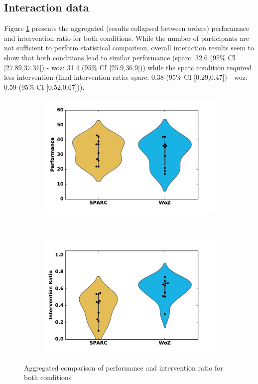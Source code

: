 \subsection{Interaction data}

Figure \ref{fig:woz_comp} presents the aggregated (results collapsed between orders) performance and intervention ratio for both conditions. While the number of participants are not sufficient to perform statistical comparison, overall interaction results seem to show that both conditions lead to similar performance (\gls{sparc}: 32.6 (95\% CI [27.89,37.31]) - \gls{woz}: 31.4 (95\% CI [25.9,36.9])) while the \gls{sparc} condition required less intervention (final intervention ratio: \gls{sparc}: 0.38 (95\% CI [0.29,0.47]) - \gls{woz}: 0.59 (95\% CI [0.52,0.67])). 

\begin{figure}[ht]
	\centering
	\begin{subfigure}[ht]{0.5\textwidth}
		\centering
		\includegraphics[width=1.0\textwidth]{perf.pdf}
	\end{subfigure}%
	~ 
	\begin{subfigure}[ht]{0.5\textwidth}
		\centering
		\includegraphics[width=1.0\textwidth]{ratio.pdf}
	\end{subfigure}
	\caption{Aggregated comparison of performance and intervention ratio for both conditions}
	\label{fig:woz_comp}
\end{figure}

